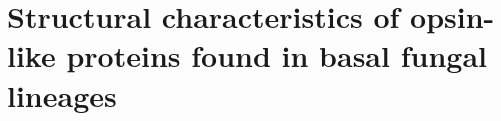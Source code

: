 \chapter{Structural characteristics of opsin-like proteins found in basal fungal lineages}
\label{chap:RhodStruct}
